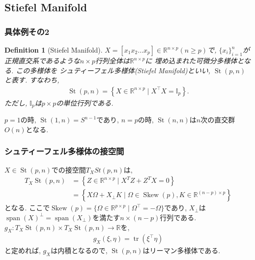 \documentclass[dvipdfmx,11pt]{beamer}		%
\newtheorem{defi}{Definition}
\newcommand{\R}{\mathbb{R}}
\begin{document}
    \subsection{Stiefel Manifold}
    \begin{frame}
        \frametitle{具体例その2}
        \begin{defi}[Stiefel Manifold]
            $X = [x_1 x_2 \ldots x_p]\in\R^{n\times p} (n\geq p)$で, 
            $\{x_{i}\}_{i = 1}^{n}$が正規直交系であるような$n\times p$行列全体は$\R^{n\times p}$に
            埋め込まれた可微分多様体となる. この多様体を
            シュティーフェル多様体(Stiefel Manifold)といい, $\operatorname{St}(p, n)$と表す. すなわち, 
            \begin{align*}
                \operatorname{St}(p, n) = \left\{X\in\R^{n\times p}\mid X^{\top}X = \mathbb{I}_{p}\right\}.
            \end{align*}
            ただし, $\mathbb{I}_{p}$は$p\times p$の単位行列である.
        \end{defi}
        $p = 1$の時, $\operatorname{St}(1, n) = S^{n - 1}$であり, $n = p$の時, $\operatorname{St}(n, n)$は$n$次の直交群$O(n)$となる.
    \end{frame}
    \begin{frame}
        \frametitle{シュティーフェル多様体の接空間}
        $X\in\operatorname{St}(p, n)$での接空間$T_{X}St(p, n)$は, 
        \begin{align*}
            T_{X} \operatorname{St}(p, n)&=\left\{Z \in \mathbb{R}^{n \times p}\mid X^{T} Z+Z^{T} X=0\right\}\\
                                         &= \left\{X \Omega+X_{\perp} K\mid \Omega\in\operatorname{Skew}(p), K \in \mathbb{R}^{(n-p) \times p}\right\}
        \end{align*}
        となる. ここで$\operatorname{Skew}(p) = \{\Omega\in\R^{p\times p}\mid \Omega^{\top} = -\Omega\}$であり, 
        $X_{\perp}$は$\operatorname{span}(X)^{\perp} = \operatorname{span}(X_{\perp})$を満たす$n\times (n - p)$行列である.
        $g_{X} : T_{X}\operatorname{St}(p, n)\times T_{X}\operatorname{St}(p, n)\to\R$を,
        \begin{align*}
            g_{X}(\xi, \eta) = \operatorname{tr}(\xi^{\top} \eta)
        \end{align*}
        と定めれば, $g_{X}$は内積となるので, $\operatorname{St}(p, n)$はリーマン多様体である. 
    \end{frame}
\end{document}
